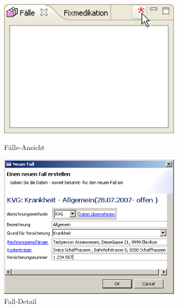 \begin{figure}[htbp]
     \begin{minipage}{0.4\textwidth}
      \centering
       \includegraphics[width=0.8\textwidth]{images/einf3}
       \caption{Fälle-Ansicht}
       	\label{fig:faelle1}
     \end{minipage}\hfill
     \begin{minipage}{0.5\textwidth}
      \centering
       \includegraphics[width=0.8\textwidth]{images/einf4}
       \caption{Fall-Detail}
       \label{fig:falldetail}
     \end{minipage}
   \end{figure}
   

